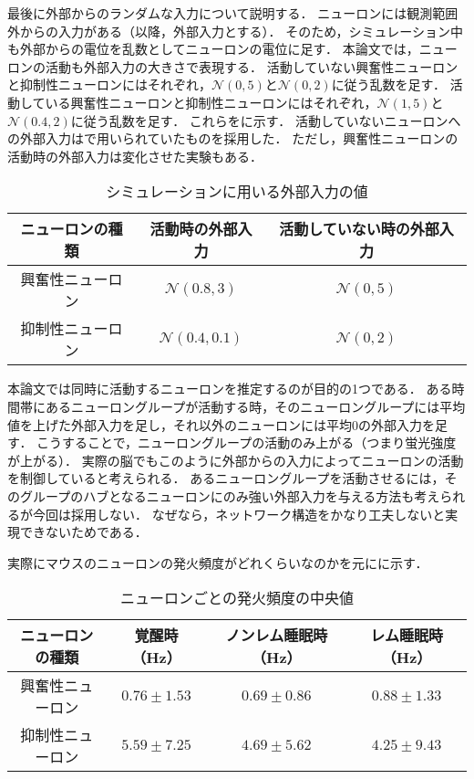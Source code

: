 最後に外部からのランダムな入力について説明する．
ニューロンには観測範囲外からの入力がある（以降，外部入力とする）．
そのため，シミュレーション中も外部からの電位を乱数としてニューロンの電位に足す．
本論文では，ニューロンの活動も外部入力の大きさで表現する．
活動していない興奮性ニューロンと抑制性ニューロンにはそれぞれ，$\mathcal{N}(0,5)$と$\mathcal{N}(0,2)$に従う乱数を足す．
活動している興奮性ニューロンと抑制性ニューロンにはそれぞれ，$\mathcal{N}(1,5)$と$\mathcal{N}(0.4,2)$に従う乱数を足す．
これらをに示す．
活動していないニューロンへの外部入力は\cite{Izhikevich2003}で用いられていたものを採用した．
ただし，興奮性ニューロンの活動時の外部入力は変化させた実験もある．

\begin{table}[htb]
  \center
  \begin{tabular}{|c|cc|} \hline
    ニューロンの種類 & 活動時の外部入力 & 活動していない時の外部入力 \\ \hline
		興奮性ニューロン & $\mathcal{N}(0.8,3)$ & $\mathcal{N}(0, 5)$ \\
		抑制性ニューロン & $\mathcal{N}(0.4, 0.1)$ & $\mathcal{N}(0, 2)$ \\ \hline
  \end{tabular}
  \caption{シミュレーションに用いる外部入力の値}
  \label{tab:parameter3}
\end{table}

本論文では同時に活動するニューロンを推定するのが目的の1つである．
ある時間帯にあるニューロングループが活動する時，そのニューロングループには平均値を上げた外部入力を足し，それ以外のニューロンには平均$0$の外部入力を足す．
こうすることで，ニューロングループの活動のみ上がる（つまり蛍光強度が上がる）．
実際の脳でもこのように外部からの入力によってニューロンの活動を制御していると考えられる．
あるニューロングループを活動させるには，そのグループのハブとなるニューロンにのみ強い外部入力を与える方法も考えられるが今回は採用しない．
なぜなら，ネットワーク構造をかなり工夫しないと実現できないためである．

実際にマウスのニューロンの発火頻度がどれくらいなのか\cite{Watson2016}を元にに示す．
\begin{table}[htb]
  \center
  \begin{tabular}{|c|ccc|} \hline
    ニューロンの種類 & 覚醒時（Hz） & ノンレム睡眠時（Hz） & レム睡眠時（Hz） \\ \hline
		興奮性ニューロン & $0.76 \pm 1.53$ & $0.69 \pm 0.86$ & $0.88 \pm 1.33$ \\
		抑制性ニューロン & $5.59 \pm 7.25$ & $4.69 \pm 5.62$ & $4.25 \pm 9.43$ \\ \hline
  \end{tabular}
  \caption{ニューロンごとの発火頻度の中央値}
  \label{tab:spike-frequency}
\end{table}

